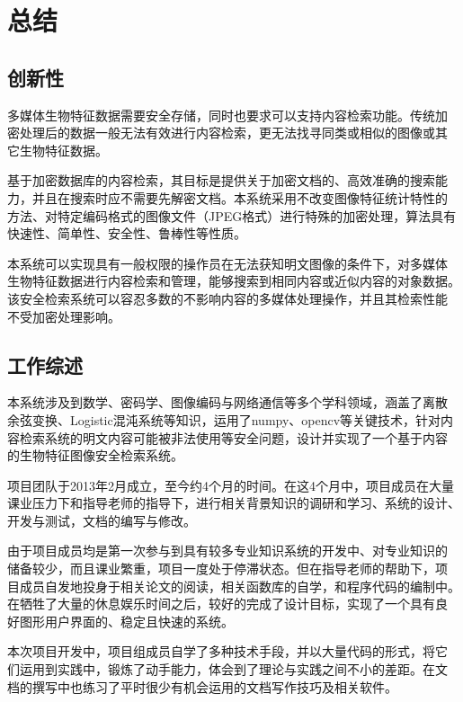 
\chapter{总结}
\label{chap:summary}

\section{创新性}
\label{sec:creative-points}

多媒体生物特征数据需要安全存储，同时也要求可以支持内容检索功能。传统加
密处理后的数据一般无法有效进行内容检索，更无法找寻同类或相似的图像或其
它生物特征数据。

基于加密数据库的内容检索，其目标是提供关于加密文档的、高效准确的搜索能
力，并且在搜索时应不需要先解密文档。本系统采用不改变图像特征统计特性的
方法、对特定编码格式的图像文件（JPEG格式）进行特殊的加密处理，算法具有
快速性、简单性、安全性、鲁棒性等性质。

本系统可以实现具有一般权限的操作员在无法获知明文图像的条件下，对多媒体
生物特征数据进行内容检索和管理，能够搜索到相同内容或近似内容的对象数据。
该安全检索系统可以容忍多数的不影响内容的多媒体处理操作，并且其检索性能
不受加密处理影响。

\section{工作综述}
\label{sec:work-overview}

本系统涉及到数学、密码学、图像编码与网络通信等多个学科领域，涵盖了离散
余弦变换、Logistic混沌系统等知识，运用了numpy、opencv等关键技术，针对内
容检索系统的明文内容可能被非法使用等安全问题，设计并实现了一个基于内容
的生物特征图像安全检索系统。

项目团队于2013年2月成立，至今约4个月的时间。在这4个月中，项目成员在大量
课业压力下和指导老师的指导下，进行相关背景知识的调研和学习、系统的设计、
开发与测试，文档的编写与修改。

由于项目成员均是第一次参与到具有较多专业知识系统的开发中、对专业知识的
储备较少，而且课业繁重，项目一度处于停滞状态。但在指导老师的帮助下，项
目成员自发地投身于相关论文的阅读，相关函数库的自学，和程序代码的编制中。
在牺牲了大量的休息娱乐时间之后，较好的完成了设计目标，实现了一个具有良
好图形用户界面的、稳定且快速的系统。

本次项目开发中，项目组成员自学了多种技术手段，并以大量代码的形式，将它
们运用到实践中，锻炼了动手能力，体会到了理论与实践之间不小的差距。在文
档的撰写中也练习了平时很少有机会运用的文档写作技巧及相关软件。

